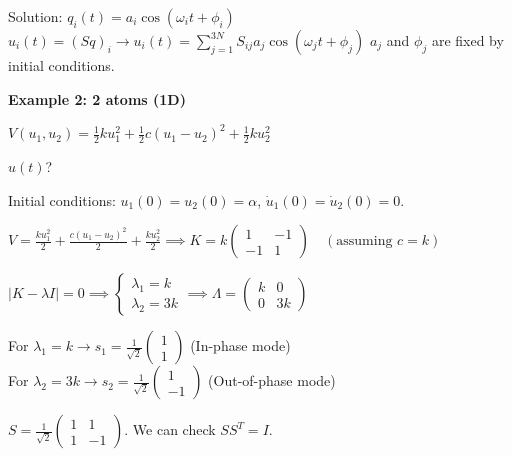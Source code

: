 \documentclass[12pt,a4paper]{report}
\newcommand{\esp}{\vspace{0.5cm}}
\begin{document}
	\esp
	
	Solution:
	$q_i(t) = a_i \cos(\omega_i t + \phi_i)$
	$u_i(t) = (S q)_i \rightarrow u_i(t) = \sum_{j=1}^{3N} S_{ij} a_j \cos(\omega_j t + \phi_j)$
	$a_j$ and $\phi_j$ are fixed by initial conditions.
	
	\esp
	
	\noindent \textbf{Example 2: 2 atoms (1D)}
	
	\esp
	
	$V(u_1, u_2) = \frac{1}{2} k u_1^2 + \frac{1}{2} c (u_1 - u_2)^2 + \frac{1}{2} k u_2^2$ 
	
	\esp
	
	$u(t)$?
	
	\esp
	
	Initial conditions: $u_1(0) = u_2(0) = \alpha$, $\dot{u}_1(0) = \dot{u}_2(0) = 0$.
	
	\esp
	
	$V = \frac{k u_1^2}{2} + \frac{c(u_1-u_2)^2}{2} + \frac{k u_2^2}{2} \implies K = k \begin{pmatrix} 1 & -1 \\ -1 & 1 \end{pmatrix} \quad (\text{assuming } c=k)$
	
	\esp
	
	$|K - \lambda I| = 0 \implies \begin{cases} \lambda_1 = k \\ \lambda_2 = 3k \end{cases} \implies \Lambda = \begin{pmatrix} k & 0 \\ 0 & 3k \end{pmatrix}$
	
	\esp
	
	For $\lambda_1 = k \to s_1 = \frac{1}{\sqrt{2}} \begin{pmatrix} 1 \\ 1 \end{pmatrix}$ (In-phase mode) \\
	For $\lambda_2 = 3k \to s_2 = \frac{1}{\sqrt{2}} \begin{pmatrix} 1 \\ -1 \end{pmatrix}$ (Out-of-phase mode)
	
	\esp
	
	$S = \frac{1}{\sqrt{2}} \begin{pmatrix} 1 & 1 \\ 1 & -1 \end{pmatrix}$. We can check $S S^T = I$.
	
\end{document}
